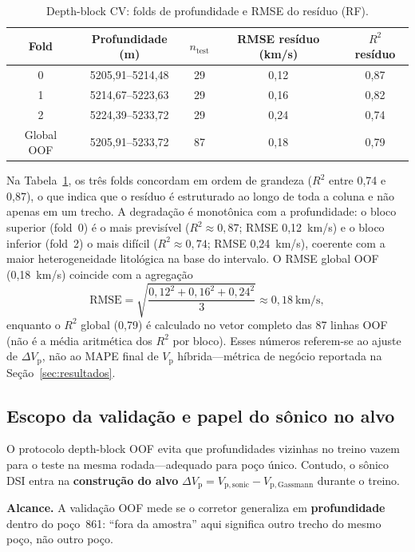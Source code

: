 \documentclass[11pt,a4paper]{article}
\numberwithin{equation}{section}
\newcommand{\Vp}{\ensuremath{V_{\mathrm{p}}}}
\begin{document}
\begin{table}[H]
  \centering
  \caption{Depth-block CV: folds de profundidade e RMSE do resíduo (RF).}
  \label{tab:folds}
  \begin{tabular}{ccccc}
    \toprule
    Fold & Profundidade (m) & $n_{\mathrm{test}}$ & RMSE resíduo (km/s) & $R^2$ resíduo \\
    \midrule
    0 & 5205,91--5214,48 & 29 & 0,12 & 0,87 \\
    1 & 5214,67--5223,63 & 29 & 0,16 & 0,82 \\
    2 & 5224,39--5233,72 & 29 & 0,24 & 0,74 \\
    \midrule
    Global OOF & 5205,91--5233,72 & 87 & 0,18 & 0,79 \\
    \bottomrule
  \end{tabular}
\end{table}

Na Tabela~\ref{tab:folds}, os três folds concordam em ordem de grandeza
($R^2$ entre 0,74 e 0,87), o que indica que o resíduo é estruturado ao longo
de toda a coluna e não apenas em um trecho.
A degradação é monotônica com a profundidade: o bloco superior (fold~0) é o
mais previsível ($R^2 \approx 0{,}87$; RMSE 0,12~km/s) e o bloco inferior
(fold~2) o mais difícil ($R^2 \approx 0{,}74$; RMSE 0,24~km/s), coerente com a
maior heterogeneidade litológica na base do intervalo.
O RMSE global OOF (0,18~km/s) coincide com a agregação
\begin{equation}
  \mathrm{RMSE}
  =
  \sqrt{\frac{0{,}12^{2}+0{,}16^{2}+0{,}24^{2}}{3}}
  \approx 0{,}18~\mathrm{km/s},
\end{equation}
enquanto o $R^2$ global (0,79) é calculado no vetor completo das 87 linhas
OOF (não é a média aritmética dos $R^2$ por bloco).
Esses números referem-se ao ajuste de $\Delta V_{\mathrm{p}}$, não ao MAPE
final de \Vp{} híbrida---métrica de negócio reportada na
Seção~\ref{sec:resultados}.

\subsection{Escopo da validação e papel do sônico no alvo}

O protocolo depth-block OOF evita que profundidades vizinhas no treino vazem
para o teste na mesma rodada---adequado para poço único.
Contudo, o sônico DSI entra na \textbf{construção do alvo}
$\Delta V_{\mathrm{p}} = V_{\mathrm{p,sonic}} - V_{\mathrm{p,Gassmann}}$ durante
o treino.

\textbf{Alcance.} A validação OOF mede se o corretor generaliza em
\textbf{profundidade} dentro do poço~861: ``fora da amostra'' aqui significa
outro trecho do mesmo poço, não outro poço.
\end{document}

